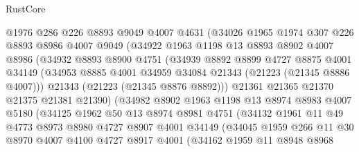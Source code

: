 \begin{lexlean}{RustCore}
\begin{coremodule}
                @1976
                @286
                @226
                @8893
                @9049
                @4007
                @4631
                (@34026
                  @1965
                  @1974
                  @307
                  @226
                  @8893
                  @8986
                  @4007
                  @9049
                  (@34922
                    @1963
                    @1198
                    @13
                    @8893
                    @8902
                    @4007
                    @8986
                    (@34932
                      @8893
                      @8900
                      @4751
                      (@34939
                        @8892
                        @8899
                        @4727
                        @8875
                        @4001
                        @34149
                        (@34953 @8885 @4001 @34959 @34084 @21343 (@21223 (@21345 @8886 @4007)))
                        @21343
                        (@21223 (@21345 @8876 @8892)))
                      @21361
                      @21365
                      @21370
                      @21375
                      @21381
                      @21390)
                    (@34982
                      @8902
                      @1963
                      @1198
                      @13
                      @8974
                      @8983
                      @4007
                      @5180
                      (@34125
                        @1962
                        @50
                        @13
                        @8974
                        @8981
                        @4751
                        (@34132
                          @1961
                          @11
                          @49
                          @4773
                          @8973
                          @8980
                          @4727
                          @8907
                          @4001
                          @34149
                          (@34045
                            @1959
                            @266
                            @11
                            @30
                            @8970
                            @4007
                            @4100
                            @4727
                            @8917
                            @4001
                            (@34162
                              @1959
                              @11
                              @8948
                              @8968

\end{coremodule}
\end{lexlean}
